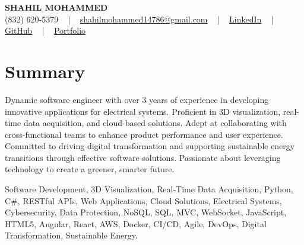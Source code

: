 \documentclass[letterpaper,10pt]{article}
\begin{document}
\begin{center}
    {\fontsize{14pt}{12pt}\selectfont \textbf{\MakeUppercase{Shahil Mohammed}}}\\ \vspace{2pt}
    \fontsize{10pt}{12pt}\selectfont (832) 620-5379 ~ | ~ \href{mailto:shahilmohammed14786@gmail.com}{shahilmohammed14786@gmail.com} ~ | ~  
    \href{https://www.linkedin.com/in/shahil-mohammed-9652931a1/}{\color{blue}\underline{LinkedIn}}  ~ | ~ 
    \href{https://github.com/freakbeast14}{\color{blue}\underline{GitHub}} ~ | ~ 
    \href{https://shahil-mohammed.netlify.app/}{\color{blue}\underline{Portfolio}}
    \vspace{-8pt}
\end{center}

\section{Summary}
\vspace{-2pt}\fontsize{8pt}{9pt}\selectfont
Dynamic software engineer with over 3 years of experience in developing innovative applications for electrical systems. Proficient in 3D visualization, real-time data acquisition, and cloud-based solutions. Adept at collaborating with cross-functional teams to enhance product performance and user experience. Committed to driving digital transformation and supporting sustainable energy transitions through effective software solutions. Passionate about leveraging technology to create a greener, smarter future.

{\fontsize{1pt}{1pt}\selectfont\color{white}
Software Development, 3D Visualization, Real-Time Data Acquisition, Python, C#, RESTful APIs, Web Applications, Cloud Solutions, Electrical Systems, Cybersecurity, Data Protection, NoSQL, SQL, MVC, WebSocket, JavaScript, HTML5, Angular, React, AWS, Docker, CI/CD, Agile, DevOps, Digital Transformation, Sustainable Energy.
}
\vspace{-8pt}

\vspace{-2pt}
\end{document}

